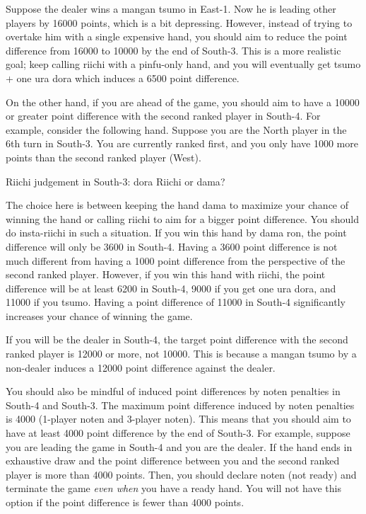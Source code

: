 \bigskip
Suppose the dealer wins a {\jap mangan tsumo} in East-1. Now he is leading other players by 16000 points, which is a bit depressing. However, instead of trying to overtake him with a single expensive hand, you should aim to reduce the point difference from 16000 to 10000 by the end of South-3. This is a more realistic goal; keep calling riichi with a {\jap pinfu}-only hand, and you will eventually get {\jap tsumo} + one {\jap ura dora} which induces a 6500 point difference. 

\bigskip
On the other hand, if you are ahead of the game, you should aim to have a 10000 or greater point difference with the second ranked player in South-4. 
For example, consider the following hand. Suppose you are the North player in the 6th turn in South-3. You are currently ranked first, and you only have 1000 more points than the second ranked player (West). 

\bigskip
\begin{itembox}[r]{{\jap Riichi} judgement in South-3: {\jap dora} {\LARGE{}}}
\bp
{}\bei
\ep
\vspace{-5pt}
{\jap Riichi} or {\jap dama}?
\end{itembox}

\bigskip
The choice here is between keeping the hand {\jap dama} to maximize your chance of winning the hand or calling riichi to aim for a bigger point difference. 
You should do insta-riichi in such a situation. If you win this hand by {\jap dama ron}, the point difference will only be 3600 in South-4. Having a 3600 point difference is not much different from having a 1000 point difference from the perspective of the second ranked player. However, if you win this hand with riichi, the point difference will be at least 6200 in South-4, 9000 if you get one {\jap ura dora}, and 11000 if you {\jap tsumo}. Having a point difference of 11000 in South-4 significantly increases your chance of winning the game. 

\bigskip
If you will be the dealer in South-4, the target point difference with the second ranked player is 12000 or more, not 10000. This is because a {\jap mangan tsumo} by a non-dealer induces a 12000 point difference against the dealer. 

\bigskip
You should also be mindful of induced point differences by {\jap noten} penalties in South-4 and South-3. The maximum point difference induced by {\jap noten} penalties is 4000 (1-player {\jap noten} and 3-player {\jap noten}). This means that you should aim to have at least 4000 point difference by the end of South-3. 
For example, suppose you are leading the game in South-4 and you are the dealer. If the hand ends in exhaustive draw and the point difference between you and the second ranked player is more than 4000 points. Then, you should declare {\jap noten} (not ready) and terminate the game \emph{even when} you have a ready hand. You will not have this option if the point difference is fewer than 4000 points. 

